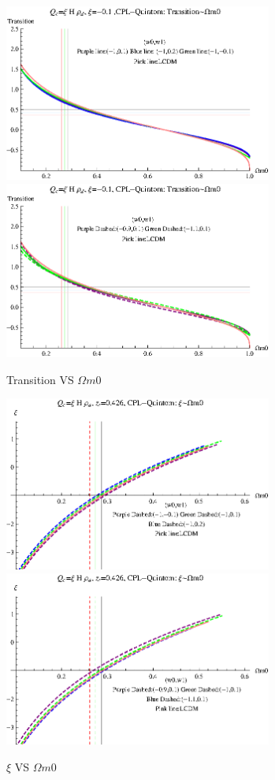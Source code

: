 \documentclass[12pt,a4paper]{article}
\begin{document}
\begin{figure}
\centering
\includegraphics[width=250pt]{rhod_I2CCPL_Quintom_TransVSOmegam01.eps}
\includegraphics[width=250pt]{rhod_I2CCPL_Quintom_TransVSOmegam02.eps}
\caption{Transition VS $\Omega m0$}\label{fig-rhod_I2CCPL_Quintom_TransVSOmegam0}
\end{figure}



\begin{figure}
\centering
\includegraphics[width=250pt]{rhod_I2CCPL_Quintom_xiVSOmegam01.eps}
\includegraphics[width=250pt]{rhod_I2CCPL_Quintom_xiVSOmegam02.eps}
\caption{$\xi$ VS $\Omega m0$}\label{fig-rhod_I2CCPL_Quintom_xiVSOmegam0}
\end{figure}
\end{document}
